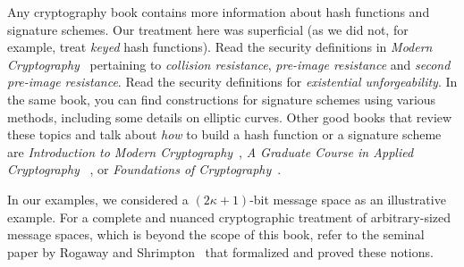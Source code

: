 Any cryptography book contains more information about hash functions and signature schemes.
Our treatment here was superficial (as we did not, for example, treat \emph{keyed} hash functions).
Read the security definitions in \emph{Modern Cryptography}~\cite{katz} pertaining to \emph{collision resistance},
\emph{pre-image resistance} and \emph{second pre-image resistance}. Read the security definitions
for \emph{existential unforgeability}. In the same book, you can find constructions for signature
schemes using various methods, including some details on elliptic curves.
Other good books that review these topics and talk about \emph{how} to build a hash function or
a signature scheme are
\emph{Introduction to Modern Cryptography}~\cite{katz},
\emph{A Graduate Course in Applied Cryptography }~\cite{cryptobook},
or
\emph{Foundations of Cryptography}~\cite{foundations1,foundations2}.

In our examples, we considered a $(2\kappa+1)$-bit message space as an illustrative example.
For a complete and nuanced cryptographic treatment of arbitrary-sized message spaces,
which is beyond the scope of this book, refer to the seminal paper by
Rogaway and Shrimpton~\cite{rogaway2004cryptographic} that formalized and proved these notions.
